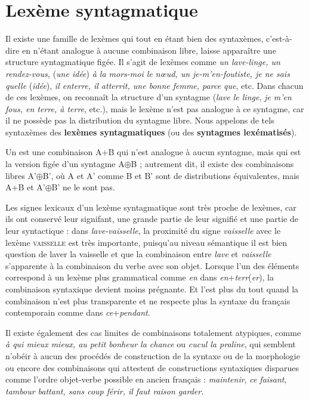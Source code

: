 \section{Lexème syntagmatique}\label{sec:3.1.12}

Il existe une famille de lexèmes qui tout en étant bien des syntaxèmes, c’est-à-dire en n’étant analogue à aucune combinaison libre, laisse apparaître une structure syntagmatique figée. Il s’agit de lexèmes comme \textit{un lave-linge, un rendez-vous,} (\textit{une idée}) \textit{à la mors-moi le nœud, un je-m’en-foutiste, je ne sais quelle} (\textit{idée}), \textit{il enterre, il atterrit, une bonne femme, parce que}, etc. Dans chacun de ces lexèmes, on reconnaît la structure d’un syntagme (\textit{lave le linge}, \textit{je m’en fous, en terre, à terre}, etc.), mais le lexème n’est pas analogue à ce syntagme, car il ne possède pas la distribution du syntagme libre. Nous appelons de tels syntaxèmes des \textbf{lexèmes syntagmatiques} (ou des \textbf{syntagmes lexématisés}).

{Un  est une combinaison A+B qui n’est analogue à aucun syntagme, mais qui est la version figée d’un syntagme A${\oplus}$B ; autrement dit, il existe des combinaisons libres A’${\oplus}$B’, où A et A’ comme B et B’ sont de distribu\-tions équivalentes, mais A+B et A’${\oplus}$B’ ne le sont pas.}

Les signes lexicaux d’un lexème syntagmatique sont très proche de lexèmes, car ils ont conservé leur signifant, une grande partie de leur signifié et une partie de leur syntactique : dans \textit{lave-vaisselle}, la proximité du signe \textit{vaisselle} avec le lexème \textsc{vaisselle} est très importante, puisqu’au niveau sémantique il est bien question de laver la vaisselle et que la combinaison entre \textit{lave} et \textit{vaisselle} s’apparente à la combinaison du verbe avec son objet. Lorsque l’un des éléments correspond à un lexème plus grammatical comme \textit{en} dans \textit{en}+\textit{terr}(\textit{er}), la combinaison syntaxique devient moins prégnante. Et l’est plus du tout quand la combinaison n’est plus transparente et ne respecte plus la syntaxe du français contemporain comme dans \textit{ce}+\textit{pendant}.

Il existe également des cas limites de combinaisons totalement atypiques, comme \textit{à qui mieux mieux, au petit bonheur la chance} ou \textit{cucul la praline}, qui semblent n’obéir à aucun des procédés de construction de la syntaxe ou de la morphologie ou encore des combinaisons qui attestent de constructions syntaxiques disparues comme l’ordre objet-verbe possible en ancien français : \textit{maintenir}, \textit{ce faisant}, \textit{tambour battant, sans coup férir, il faut raison garder}.

